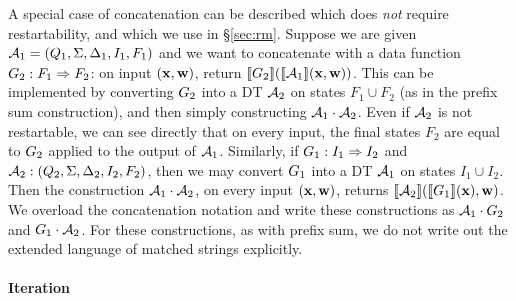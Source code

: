 A special case of concatenation can be described which does \emph{not} require restartability, and which we use in \S\ref{sec:rm}. Suppose we are given $\mathcal{A}_1 = (Q_{1}, \Sigma, \Delta_{1}, I_{1}, F_{1})$ and we want to concatenate with a data function $G_2: F_1 \Rightarrow F_2$: on input $(\textbf{x}, \textbf{w})$, return $\llbracket G_2 \rrbracket(\llbracket \mathcal{A}_1 \rrbracket(\textbf{x},\textbf{w}))$. This can be implemented by converting $G_2$ into a DT $\mathcal{A}_2$ on states $F_1 \cup F_2$ (as in the prefix sum construction), and then simply constructing $\mathcal{A}_1 \cdot \mathcal{A}_2$. Even if $\mathcal{A}_2$ is not restartable, we can see directly that on every input, the final states $F_2$ are equal to $G_2$ applied to the output of $\mathcal{A}_1$.
Similarly, if $G_1: I_1 \Rightarrow I_2$ and $\mathcal{A}_2: (Q_{2}, \Sigma, \Delta_{2}, I_{2}, F_{2})$, then we may convert $G_1$ into a DT $\mathcal{A}_1$ on states $I_1 \cup I_2$. Then the construction $\mathcal{A}_1 \cdot \mathcal{A}_2$, on every input $(\textbf{x},\textbf{w})$, returns $\llbracket \mathcal{A}_2 \rrbracket(\llbracket G_1 \rrbracket(\textbf{x}),\textbf{w})$.
We overload the concatenation notation and write these constructions as $\mathcal{A}_1 \cdot G_2$ and $G_1 \cdot \mathcal{A}_2$. For these constructions, as with prefix sum, we do not write out the extended language of matched strings explicitly.

\begin{figure*}[h]

\label{fig:concatenation-with-DF}
\end{figure*}

\paragraph*{Iteration}

